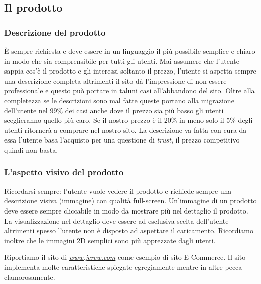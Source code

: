 	\subsection{Il prodotto}
	
		\subsubsection{Descrizione del prodotto}
			È sempre richiesta e deve essere in un linguaggio il più possibile semplice e chiaro in modo che sia comprensibile per tutti gli utenti. Mai assumere che l'utente sappia cos'è il prodotto e gli interessi soltanto il prezzo, l'utente si aspetta sempre una descrizione completa altrimenti il sito dà l'impressione di non essere professionale e questo può portare in taluni casi all'abbandono del sito.
			Oltre alla completezza se le descrizioni sono mal fatte queste portano alla migrazione dell'utente nel 99\% dei casi anche dove il prezzo sia più basso gli utenti sceglieranno quello più caro. Se il nostro prezzo è il 20\% in meno solo il 5\% degli utenti ritornerà a comprare nel nostro sito. La descrizione va fatta con cura da essa l'utente basa l'acquisto per una questione di \emph{trust}, il prezzo competitivo quindi non basta.
		
		\subsubsection{L'aspetto visivo del prodotto}
			Ricordarsi sempre: l'utente vuole vedere il prodotto e richiede sempre una descrizione visiva (immagine) con qualità full-screen. Un'immagine di un prodotto deve essere sempre cliccabile in modo da mostrare più nel dettaglio il prodotto. La visualizzazione nel dettaglio deve essere ad esclusiva scelta dell'utente altrimenti spesso l'utente non è disposto ad aspettare il caricamento. Ricordiamo inoltre che le immagini 2D semplici sono più apprezzate dagli utenti.
		
			Riportiamo il sito di \href{https://www.jcrew.com/it/womens_category/sunglasses.jsp?intcmp=h1_sunglasses}{\emph{www.jcrew.com}} come esempio di sito E-Commerce. Il sito implementa molte caratteristiche spiegate egregiamente mentre in altre pecca clamorosamente.